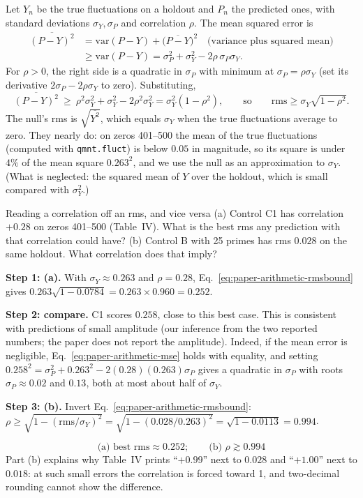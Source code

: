 Let $Y_n$ be the true fluctuations on a holdout and $P_n$ the predicted ones, with standard deviations $\sigma_Y,\sigma_P$ and correlation $\rho$. The mean squared error is
\begin{align}
\overline{(P-Y)^2} &= \mathrm{var}(P-Y) + \bigl(\overline{P-Y}\bigr)^2
\quad\text{(variance plus squared mean)}\nonumber\\
&\ge \mathrm{var}(P-Y)
= \sigma_P^2+\sigma_Y^2-2\rho\,\sigma_P\sigma_Y .
\label{eq:paper-arithmetic-mse}
\end{align}
For $\rho>0$, the right side is a quadratic in $\sigma_P$ with minimum at $\sigma_P=\rho\sigma_Y$ (set its derivative $2\sigma_P-2\rho\sigma_Y$ to zero). Substituting,
\begin{equation}
\overline{(P-Y)^2}\ \ge\ \rho^2\sigma_Y^2+\sigma_Y^2-2\rho^2\sigma_Y^2 = \sigma_Y^2(1-\rho^2),
\qquad\text{so}\qquad
\mathrm{rms} \ge \sigma_Y\sqrt{1-\rho^2}.
\label{eq:paper-arithmetic-rmsbound}
\end{equation}
The null's rms is $\sqrt{\overline{Y^2}}$, which equals $\sigma_Y$ when the true fluctuations average to zero. They nearly do: on zeros 401--500 the mean of the true fluctuations (computed with \texttt{qmnt.fluct}) is below $0.05$ in magnitude, so its square is under $4\%$ of the mean square $0.263^2$, and we use the null as an approximation to $\sigma_Y$. (What is neglected: the squared mean of $Y$ over the holdout, which is small compared with $\sigma_Y^2$.)

\begin{sample}{Reading a correlation off an rms, and vice versa}
(a) Control C1 has correlation $+0.28$ on zeros 401--500 (Table~IV). What is the best rms any prediction with that correlation could have? (b) Control B with 25 primes has rms $0.028$ on the same holdout. What correlation does that imply?

\textbf{Step 1: (a).} With $\sigma_Y\approx0.263$ and $\rho=0.28$, Eq.~\eqref{eq:paper-arithmetic-rmsbound} gives $0.263\sqrt{1-0.0784}=0.263\times0.960=0.252$.

\textbf{Step 2: compare.} C1 scores $0.258$, close to this best case. This is consistent with predictions of small amplitude (our inference from the two reported numbers; the paper does not report the amplitude). Indeed, if the mean error is negligible, Eq.~\eqref{eq:paper-arithmetic-mse} holds with equality, and setting $0.258^2=\sigma_P^2+0.263^2-2(0.28)(0.263)\sigma_P$ gives a quadratic in $\sigma_P$ with roots $\sigma_P\approx0.02$ and $0.13$, both at most about half of $\sigma_Y$.

\textbf{Step 3: (b).} Invert Eq.~\eqref{eq:paper-arithmetic-rmsbound}: $\rho\ge\sqrt{1-(\mathrm{rms}/\sigma_Y)^2}=\sqrt{1-(0.028/0.263)^2}=\sqrt{1-0.0113}=0.994$.

\[
\boxed{\text{(a) best rms}\approx0.252;\qquad\text{(b) } \rho\gtrsim0.994}
\]
Part (b) explains why Table~IV prints ``$+0.99$'' next to $0.028$ and ``$+1.00$'' next to $0.018$: at such small errors the correlation is forced toward 1, and two-decimal rounding cannot show the difference.
\end{sample}

